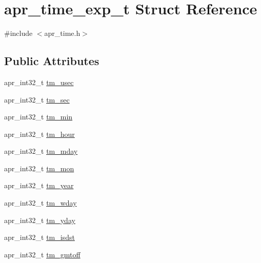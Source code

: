 \hypertarget{structapr__time__exp__t}{}\section{apr\+\_\+time\+\_\+exp\+\_\+t Struct Reference}
\label{structapr__time__exp__t}


{\ttfamily \#include $<$apr\+\_\+time.\+h$>$}

\subsection*{Public Attributes}
\begin{DoxyCompactItemize}
\item 
apr\+\_\+int32\+\_\+t \mbox{\hyperlink{structapr__time__exp__t_ac5f11e3c1f5a30d357df2108296a8d30}{tm\+\_\+usec}}
\item 
apr\+\_\+int32\+\_\+t \mbox{\hyperlink{structapr__time__exp__t_a2c29c99a75b55237917cb05ebae6706c}{tm\+\_\+sec}}
\item 
apr\+\_\+int32\+\_\+t \mbox{\hyperlink{structapr__time__exp__t_a56a380db482ba5b2bef43351faad27fb}{tm\+\_\+min}}
\item 
apr\+\_\+int32\+\_\+t \mbox{\hyperlink{structapr__time__exp__t_a2dbab1d10ed6234c8e9e714e13b7911c}{tm\+\_\+hour}}
\item 
apr\+\_\+int32\+\_\+t \mbox{\hyperlink{structapr__time__exp__t_a6c09a274f011841e9e988c3c9504848a}{tm\+\_\+mday}}
\item 
apr\+\_\+int32\+\_\+t \mbox{\hyperlink{structapr__time__exp__t_a746f38956dfeb6be3bd17282791e3577}{tm\+\_\+mon}}
\item 
apr\+\_\+int32\+\_\+t \mbox{\hyperlink{structapr__time__exp__t_a35c32245be49279a6689e34bcd6e534a}{tm\+\_\+year}}
\item 
apr\+\_\+int32\+\_\+t \mbox{\hyperlink{structapr__time__exp__t_a57e892bbf3c52df34dcff2c6a9f1adbf}{tm\+\_\+wday}}
\item 
apr\+\_\+int32\+\_\+t \mbox{\hyperlink{structapr__time__exp__t_aa15c7ab0d7e2a974e89cc1470f1583ab}{tm\+\_\+yday}}
\item 
apr\+\_\+int32\+\_\+t \mbox{\hyperlink{structapr__time__exp__t_a4d899f1fb9fde3c6b6893941fa81b1c8}{tm\+\_\+isdst}}
\item 
apr\+\_\+int32\+\_\+t \mbox{\hyperlink{structapr__time__exp__t_a1102ca16ed70b1c707473431eed58d7b}{tm\+\_\+gmtoff}}
\end{DoxyCompactItemize}


